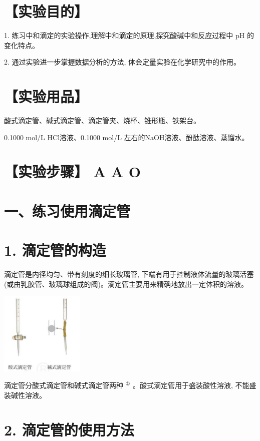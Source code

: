 \documentclass[10pt]{article}
\begin{document}
\section*{【实验目的】}

1. 练习中和滴定的实验操作,理解中和滴定的原理,探究酸碱中和反应过程中 \(\mathrm{{pH}}\) 的变化特点。

2. 通过实验进一步掌握数据分析的方法, 体会定量实验在化学研究中的作用。

\section*{【实验用品】}

酸式滴定管、碱式滴定管、滴定管夹、烧杯、锥形瓶、铁架台。

0.1000 mol/L HCl溶液、0.1000 mol/L 左右的NaOH溶液、酚酞溶液、蒸馏水。

\section*{【实验步骤】 A A O}

\section*{一、练习使用滴定管}

\section*{1. 滴定管的构造}

滴定管是内径均匀、带有刻度的细长玻璃管, 下端有用于控制液体流量的玻璃活塞 (或由乳胶管、玻璃球组成的阀)。滴定管主要用来精确地放出一定体积的溶液。

\begin{center}
\includegraphics[max width=0.3\textwidth]{images/0190da9d-8bfd-732f-bc2c-0b21d0f13b91_96_481805.jpg}
\end{center}

滴定管分酸式滴定管和碱式滴定管两种 \({}^{\text{①}}\) 。酸式滴定管用于盛装酸性溶液, 不能盛装碱性溶液。

\section*{2. 滴定管的使用方法}
\end{document}
